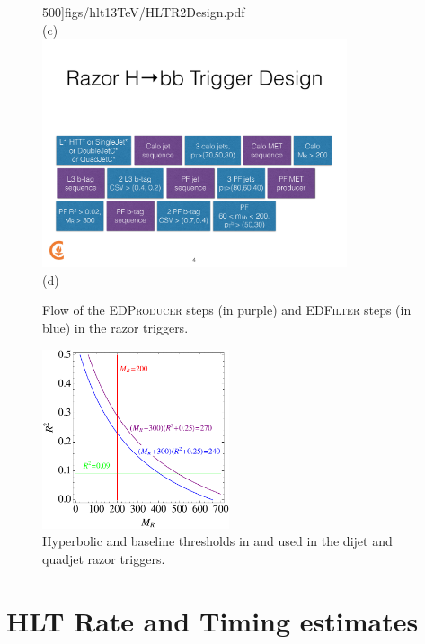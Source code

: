 \begin{figure}[ht!]
500]{figs/hlt13TeV/HLTR2Design.pdf}\\
(c)\\
\includegraphics[width=0.8\textwidth,clip=true,viewport=0 110 1024
500]{figs/hlt13TeV/HLTRazorHbbDesign.pdf}\\
(d)
\caption{\label{fig:HLTdesign} Flow of the \textsc{EDProducer} steps (in purple)
  and \textsc{EDFilter} steps (in blue) in
  the razor triggers.}
\end{figure}

\begin{figure}[ht!]
\centering
\includegraphics[width=0.49\textwidth]{figs/hlt13TeV/HLTRsqMR.pdf}
\caption{\label{fig:hyperbolic} Hyperbolic and baseline thresholds in
  \Rtwo and \MR used in the dijet and quadjet razor triggers.}
\end{figure}

\section{HLT Rate and Timing estimates}

\begin{table}[ht!]
\centering
 \caption{Rates for 0\unit{T} triggers.
 \label{tab:rates0T}}
\end{table}

